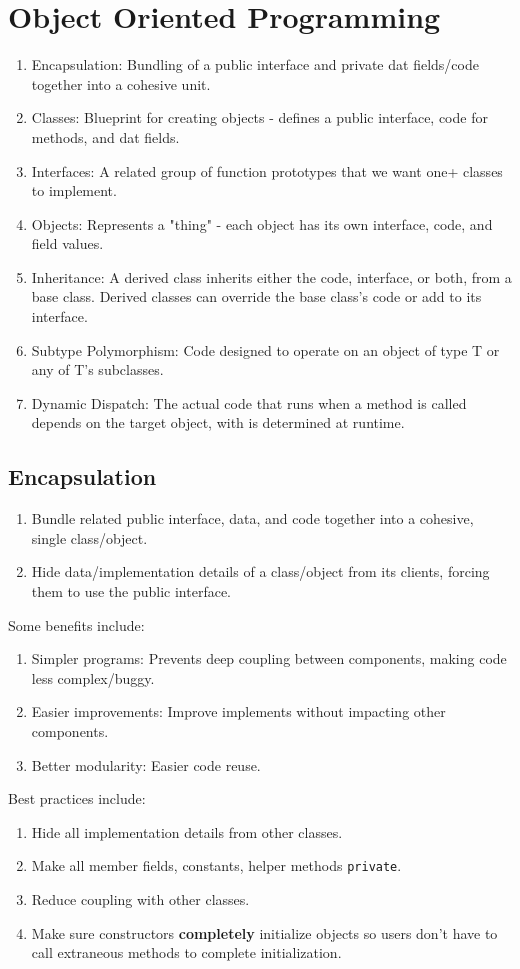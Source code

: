 \documentclass{article}
\begin{document}
\section{Object Oriented Programming}
\begin{enumerate}[label=(\roman*)]
\item Encapsulation: Bundling of a public interface and private dat
  fields/code together into a cohesive unit.
\item Classes: Blueprint for creating objects - defines a public
  interface, code for methods, and dat fields.
\item Interfaces: A related group of function prototypes that we want
  one+ classes to implement.
\item Objects: Represents a "thing" - each object has its own
  interface, code, and field values.
\item Inheritance: A derived class inherits either the code,
  interface, or both, from a base class. Derived classes can override
  the base class's code or add to its interface.
\item Subtype Polymorphism: Code designed to operate on an object of
  type T or any of T's subclasses.
\item Dynamic Dispatch: The actual code that runs when a method is
  called depends on the target object, with is determined at runtime.
\end{enumerate}

\subsection{Encapsulation}
\begin{enumerate}[label=(\roman*)]
\item Bundle related public interface, data, and code together into a
  cohesive, single class/object.
\item Hide data/implementation details of a class/object from its clients,
  forcing them to use the public interface.
\end{enumerate}
Some benefits include:
\begin{enumerate}[label=(\roman*)]
\item Simpler programs: Prevents deep coupling between components,
  making code less complex/buggy.
\item Easier improvements: Improve implements without impacting other
  components. 
\item Better modularity: Easier code reuse.
\end{enumerate}
Best practices include:
\begin{enumerate}[label=(\roman*)]
\item Hide all implementation details from other classes.
\item Make all member fields, constants, helper methods \texttt{private}.
\item Reduce coupling with other classes.
\item Make sure constructors \textbf{completely} initialize objects so
  users don't have to call extraneous methods to complete initialization.
\end{enumerate}
\end{document}
